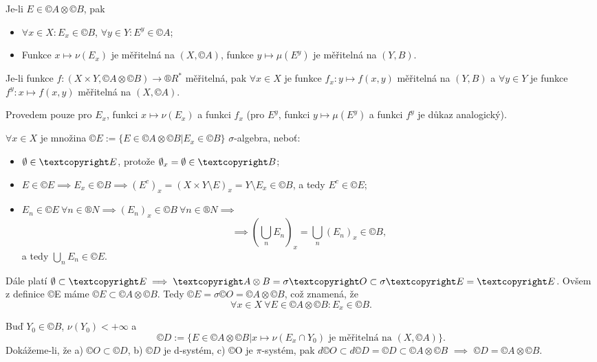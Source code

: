 \documentclass[12pt]{article}					%
\begin{document}
\begin{veta}
	Je-li $E \in ©A \otimes ©B$, pak

	\begin{itemize}
		\item $\forall x \in X: E_x \in ©B$, $\forall y \in Y: E^y \in ©A$;
		\item Funkce $x \mapsto \nu(E_x)$ je měřitelná na $(X, ©A)$, funkce $y \mapsto \mu(E^y)$ je měřitelná na $(Y, B)$.
	\end{itemize}

	Je-li funkce $f: (X \times Y, ©A \otimes ©B) \rightarrow ®R^*$ měřitelná, pak $\forall x \in X$ je funkce $f_x: y \mapsto f(x, y)$ měřitelná na $(Y, B)$ a $\forall y \in Y$ je funkce $f^y: x \mapsto f(x, y)$ měřitelná na $(X, ©A)$.

	\begin{dukazin}
		Provedem pouze pro $E_x$, funkci $x \mapsto \nu(E_x)$ a funkci $f_x$ (pro $E^y$, funkci $y \mapsto \mu(E^y)$ a funkci $f^y$ je důkaz analogický).
	\end{dukazin}

	\begin{dukazin}[1.]
		$\forall x \in X$ je množina $©E := \{E \in ©A \otimes ©B | E_x \in ©B\}$ $\sigma$-algebra, neboť:
		
		\begin{itemize}
			\item $\O \in ©E$, protože $\O_x = \O \in ©B$;
			\item $E \in ©E \implies E_x \in ©B \implies (E^c)_x = (X \times Y \setminus E)_x = Y \setminus E_x \in ©B$, a tedy $E^c \in ©E$;
			\item $E_n \in ©E\ \forall n \in ®N \implies (E_n)_x \in ©B\ \forall n \in ®N \implies$
				$$ \implies (\bigcup_n E_n)_x = \bigcup_n(E_n)_x \in ©B, $$
				a tedy $\bigcup_n E_n \in ©E$.
		\end{itemize}

		Dále platí $\O \subset ©E \implies ©A \otimes B = \sigma ©O \subset \sigma ©E = ©E$. Ovšem z definice ©E máme $©E \subset ©A \otimes ©B$. Tedy $©E = \sigma ©O = ©A \otimes ©B$, což znamená, že
		$$ \forall x \in X\ \forall E \in ©A \otimes ©B: E_x \in ©B. $$
	\end{dukazin}

	\begin{dukazin}[3.]
		Buď $Y_0 \in ©B$, $\nu(Y_0) < +∞$ a
		$$ ©D := \{E \in ©A \otimes ©B | x \mapsto \nu(E_x \cap Y_0) \text{ je měřitelná na } (X, ©A)\}. $$
		Dokážeme-li, že a) $©O \subset ©D$, b) $©D$ je d-systém, c) ©O je $\pi$-systém, pak $d©O \subset d©D = ©D \subset ©A \otimes ©B$ $\implies$ $©D = ©A \otimes ©B$.


\end{dukazin}
\end{veta}
\end{document}
